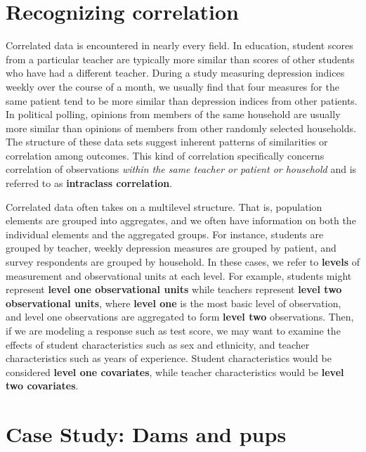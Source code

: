 \documentclass[
]{krantz}
\begin{document}
\hypertarget{recognizing-correlation}{%
\section{Recognizing correlation}\label{recognizing-correlation}}

Correlated data is encountered in nearly every field. In education, student scores from a particular teacher are typically more similar than scores of other students who have had a different teacher. During a study measuring depression indices weekly over the course of a month, we usually find that four measures for the same patient tend to be more similar than depression indices from other patients. In political polling, opinions from members of the same household are usually more similar than opinions of members from other randomly selected households. The structure of these data sets suggest inherent patterns of similarities or correlation among outcomes. This kind of correlation specifically concerns correlation of observations \emph{within the same teacher or patient or household} and is referred to as \textbf{intraclass correlation}. 

Correlated data often takes on a multilevel structure. That is, population elements are grouped into aggregates, and we often have information on both the individual elements and the aggregated groups. For instance, students are grouped by teacher, weekly depression measures are grouped by patient, and survey respondents are grouped by household. In these cases, we refer to \textbf{levels}  of measurement and observational units at each level. For example, students might represent \textbf{level one observational units} while teachers represent \textbf{level two observational units}, where \textbf{level one} is the most basic level of observation, and level one observations are aggregated to form \textbf{level two} observations. Then, if we are modeling a response such as test score, we may want to examine the effects of student characteristics such as sex and ethnicity, and teacher characteristics such as years of experience. Student characteristics would be considered \textbf{level one covariates}, while teacher characteristics would be \textbf{level two covariates}.

\hypertarget{case-study-dams-and-pups}{%
\section{Case Study: Dams and pups}\label{case-study-dams-and-pups}}
\end{document}
